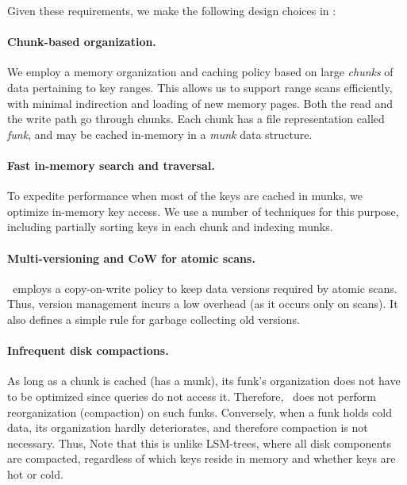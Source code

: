 \begin{description}
\end{description} 



Given these requirements, we make the following design choices in \sys:
\paragraph{Chunk-based organization.} We employ a memory organization and caching policy based on large \emph{chunks} of data pertaining to key ranges.  This allows us to support 
 range scans efficiently, with minimal indirection and loading of new memory pages. 
Both the read and the write path go through chunks. 
Each chunk has a file representation called  \emph{funk}, and may be cached 
in-memory in a  \emph{munk} data structure.
\paragraph{Fast in-memory search and traversal.} To expedite performance when 
most of the keys are cached in munks, 
we  optimize in-memory key access. We use a number of techniques for this purpose, including partially sorting keys in each chunk and 
indexing munks.
\paragraph{Multi-versioning and CoW for atomic scans.} \sys\ employs a copy-on-write policy to keep data versions required by atomic scans.
Thus, version management incurs a low overhead (as it occurs only on scans). It also defines a simple rule for garbage collecting old versions.
\paragraph{Infrequent disk compactions.} 
As long as a chunk is cached (has a munk), its funk's organization does not have to be optimized since 
queries do not access it. Therefore, \sys\ does not perform reorganization (compaction) on such funks.
Conversely, when a funk holds cold data, its organization hardly deteriorates, and therefore compaction is not necessary.
Thus,  
Note that this is unlike LSM-trees, where all disk components are compacted, regardless of which keys reside in memory and whether 
keys are hot or cold. 

